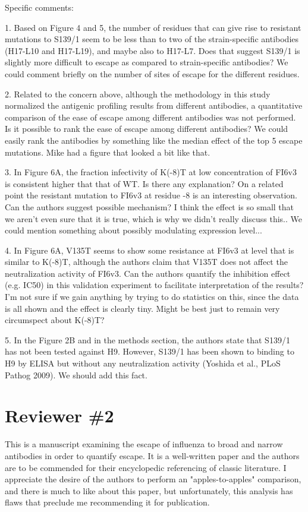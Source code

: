 \documentclass[11pt, oneside]{article}   	%
\begin{document}
Specific comments:

1. Based on Figure 4 and 5, the number of residues that can give rise to resistant mutations to S139/1 seem to be less than to two of the strain-specific antibodies (H17-L10 and H17-L19), and maybe also to H17-L7. Does that suggest S139/1 is slightly more difficult to escape as compared to strain-specific antibodies?
{\color{red} We could comment briefly on the number of sites of escape for the different residues.}

2. Related to the concern above, although the methodology in this study normalized the antigenic profiling results from different antibodies, a quantitative comparison of the ease of escape among different antibodies was not performed. Is it possible to rank the ease of escape among different antibodies?
{\color{red} We could easily rank the antibodies by something like the median effect of the top 5 escape mutations. Mike had a figure that looked a bit like that.}

3. In Figure 6A, the fraction infectivity of K(-8)T at low concentration of FI6v3 is consistent higher that that of WT. Is there any explanation? On a related point the resistant mutation to FI6v3 at residue -8 is an interesting observation. Can the authors suggest possible mechanism?
{\color{red} I think the effect is so small that we aren't even sure that it is true, which is why we didn't really discuss this.. We could mention something about possibly modulating expression level...}

4. In Figure 6A, V135T seems to show some resistance at FI6v3 at level that is similar to K(-8)T, although the authors claim that V135T does not affect the neutralization activity of FI6v3. Can the authors quantify the inhibition effect (e.g. IC50) in this validation experiment to facilitate interpretation of the results?
{\color{red} I'm not sure if we gain anything by trying to do statistics on this, since the data is all shown and the effect is clearly tiny. 
Might be best just to remain very circumspect about K(-8)T?}

5. In the Figure 2B and in the methods section, the authors state that S139/1 has not been tested against H9. However, S139/1 has been shown to binding to H9 by ELISA but without any neutralization activity (Yoshida et al., PLoS Pathog 2009).
{\color{red} We should add this fact.}

\section*{Reviewer \#2} 
This is a manuscript examining the escape of influenza to broad and narrow antibodies in order to quantify escape. It is a well-written paper and the authors are to be commended for their encyclopedic referencing of classic literature. I appreciate the desire of the authors to perform an "apples-to-apples" comparison, and there is much to like about this paper, but unfortunately, this analysis has flaws that preclude me recommending it for publication.
\end{document}
